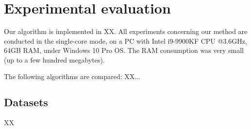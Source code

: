 \documentclass{bmcart}
\begin{document}
 
\section{Experimental evaluation}\label{sec:experiments}

Our  algorithm is implemented in XX. All experiments concerning our method are conducted in the single-core mode, on a PC with Intel i9-9900KF CPU @3.6GHz, 64GB RAM, under Windows 10 Pro OS. The RAM consumption was very small (up to a few hundred megabytes).   

The following algorithms  are compared: XX...


\subsection{Datasets}
 XX
 
\end{document}
